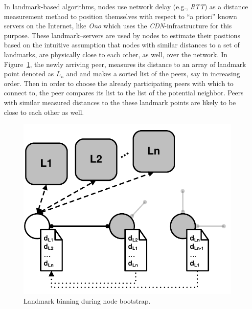 In landmark-based algorithms, nodes use network delay (e.g., \emph{RTT}) as a
distance measurement method to position themselves with respect to ``a priori''
known servers on the Internet, like \emph{Ono} which uses the \emph{CDN}-infrastructure
for this purpose.
These landmark--servers are used by nodes to estimate 
their positions based on the intuitive assumption that nodes
with similar distances to a set of landmarks, are physically close to each
other, as well, over the network. 
In Figure~\ref{figure:landmarking}, the newly
arriving peer, measures its distance to an array of landmark point denoted as
$L_n$ and and makes a sorted list of the peers, say in increasing order. Then in
order to choose the already participating peers with which to connect to,
the peer compares its list to the list of the potential neighbor. Peers with similar
measured distances to the these landmark points are likely to be close to
each other as well.
\begin{figure}[ht]
\centering
  \includegraphics[scale=0.35]{img/pdf/landmarking.pdf}
\caption{Landmark binning during node bootstrap.}
\label{figure:landmarking}
\end{figure}




